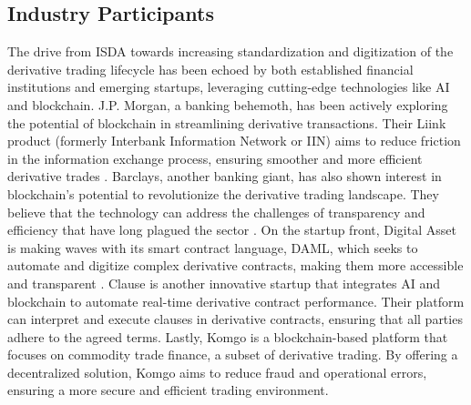\subsection{Industry Participants}
\label{subsec:industry_participants}
The drive from ISDA towards increasing standardization and digitization of the derivative trading lifecycle has been echoed by both established financial institutions and emerging startups, leveraging cutting-edge technologies like AI and blockchain. J.P. Morgan, a banking behemoth, has been actively exploring the potential of blockchain in streamlining derivative transactions. Their Liink product (formerly Interbank Information Network or IIN) aims to reduce friction in the information exchange process, ensuring smoother and more efficient derivative trades \citep{jpm_liink}. Barclays, another banking giant, has also shown interest in blockchain's potential to revolutionize the derivative trading landscape. They believe that the technology can address the challenges of transparency and efficiency that have long plagued the sector \citep{barclays}. On the startup front, Digital Asset is making waves with its smart contract language, DAML, which seeks to automate and digitize complex derivative contracts, making them more accessible and transparent \citep{daml}. Clause \citep{clause_startup} is another innovative startup that integrates AI and blockchain to automate real-time derivative contract performance. Their platform can interpret and execute clauses in derivative contracts, ensuring that all parties adhere to the agreed terms. Lastly, Komgo \citep{komgo_startup} is a blockchain-based platform that focuses on commodity trade finance, a subset of derivative trading. By offering a decentralized solution, Komgo aims to reduce fraud and operational errors, ensuring a more secure and efficient trading environment.